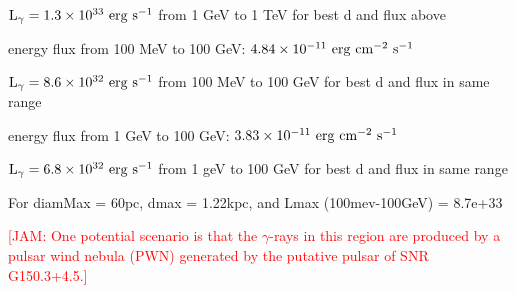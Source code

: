 \documentclass[iop]{emulateapj}
\newcommand{\kibitz}[2]{\ifnum\Comments=1\textcolor{#1}{#2}\fi}
\newcommand{\jamie}[1]{\kibitz{red}      {[JAM: #1]}}
\newcommand{\gam}{$\gamma$-ray}
\newcommand{\Gone}{G150.3+4.5}
\begin{document}
${\rm L_{\gamma} = 1.3 \times 10^{33}~erg~s^{-1}}$ from 1 GeV to 1 TeV for best d and flux above


energy flux from 100 MeV to 100 GeV: ${\rm 4.84 \times 10^{-11}~erg~cm^{-2}~s^{-1}} $

${\rm L_{\gamma} = 8.6 \times 10^{32}~erg~s^{-1}}$ from 100 MeV to 100 GeV for best d and flux in same range

energy flux from 1 GeV to 100 GeV: ${\rm 3.83 \times 10^{-11}~erg~cm^{-2}~s^{-1}} $

${\rm L_{\gamma} = 6.8 \times 10^{32}~erg~s^{-1}}$ from 1 geV to 100 GeV for best d and flux in same range

For diamMax = 60pc, dmax = 1.22kpc, and Lmax (100mev-100GeV) = 8.7e+33

\jamie{One potential scenario is that the \gam{}s in this region are produced by a pulsar wind nebula (PWN) generated by the putative pulsar of SNR \Gone{}.} 
%
%


%

\end{document}
